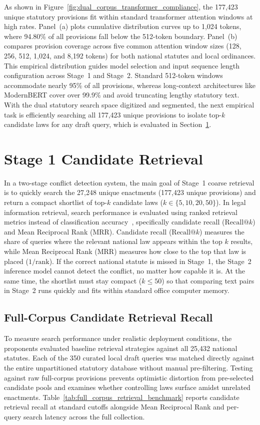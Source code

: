 As shown in Figure~\ref{fig:dual_corpus_transformer_compliance}, the 177,423 unique statutory provisions fit within standard transformer attention windows at high rates. Panel~(a) plots cumulative distribution curves up to 1,024 tokens, where 94.80\% of all provisions fall below the 512-token boundary. Panel~(b) compares provision coverage across five common attention window sizes (128, 256, 512, 1,024, and 8,192 tokens) for both national statutes and local ordinances. This empirical distribution guides model selection and input sequence length configuration across Stage~1 and Stage~2. Standard 512-token windows accommodate nearly 95\% of all provisions, whereas long-context architectures like ModernBERT cover over 99.9\% and avoid truncating lengthy statutory text. With the dual statutory search space digitized and segmented, the next empirical task is efficiently searching all 177,423 unique provisions to isolate top-$k$ candidate laws for any draft query, which is evaluated in Section~\ref{sec:results_stage1_retrieval}.


\section{Stage 1 Candidate Retrieval}
\label{sec:results_stage1_retrieval}

In a two-stage conflict detection system, the main goal of Stage~1 coarse retrieval is to quickly search the 27,248 unique enactments (177,423 unique provisions) and return a compact shortlist of top-$k$ candidate laws ($k \in \{5, 10, 20, 50\}$). In legal information retrieval, search performance is evaluated using ranked retrieval metrics instead of classification accuracy~\cite{manning2008introduction}, specifically candidate recall ($\text{Recall@}k$) and Mean Reciprocal Rank ($\text{MRR}$). Candidate recall ($\text{Recall@}k$) measures the share of queries where the relevant national law appears within the top $k$ results, while Mean Reciprocal Rank ($\text{MRR}$) measures how close to the top that law is placed ($1/\text{rank}$). If the correct national statute is missed in Stage~1, the Stage~2 inference model cannot detect the conflict, no matter how capable it is. At the same time, the shortlist must stay compact ($k \le 50$) so that comparing text pairs in Stage~2 runs quickly and fits within standard office computer memory.


\subsection{Full-Corpus Candidate Retrieval Recall}
To measure search performance under realistic deployment conditions, the proponents evaluated baseline retrieval strategies against all 25,432 national statutes. Each of the 350 curated local draft queries was matched directly against the entire unpartitioned statutory database without manual pre-filtering. Testing against raw full-corpus provisions prevents optimistic distortion from pre-selected candidate pools and examines whether controlling laws surface amidst unrelated enactments. Table~\ref{tab:full_corpus_retrieval_benchmark} reports candidate retrieval recall at standard cutoffs alongside Mean Reciprocal Rank and per-query search latency across the full collection.

